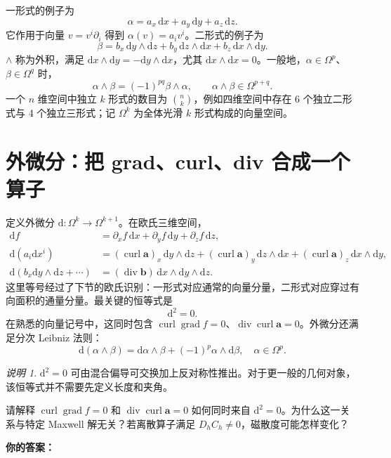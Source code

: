 \documentclass[UTF8,11pt,openany]{ctexbook}
\numberwithin{equation}{chapter}
\theoremstyle{definition}
\theoremstyle{remark}
\newtheorem{remark}[theorem]{说明}
\newcommand{\dd}{\mathrm d}
\newcommand{\grad}{\operatorname{grad}}
\newcommand{\Div}{\operatorname{div}}
\newcommand{\curl}{\operatorname{curl}}
\begin{document}
一形式的例子为
\begin{equation}
\alpha=a_x\,\dd x+a_y\,\dd y+a_z\,\dd z.
\end{equation}
它作用于向量 $v=v^i\partial_i$ 得到 $\alpha(v)=a_iv^i$。二形式的例子为
\begin{equation}
\beta=b_x\,\dd y\wedge\dd z+b_y\,\dd z\wedge\dd x+b_z\,\dd x\wedge\dd y.
\end{equation}
$\wedge$ 称为外积，满足 $\dd x\wedge\dd y=-\dd y\wedge\dd x$，尤其 $\dd x\wedge\dd x=0$。一般地，$\alpha\in\Omega^p$、$\beta\in\Omega^q$ 时，
\begin{equation}
\alpha\wedge\beta=(-1)^{pq}\beta\wedge\alpha,\qquad
\alpha\wedge\beta\in\Omega^{p+q}.
\end{equation}
一个 $n$ 维空间中独立 $k$ 形式的数目为 $\binom nk$，例如四维空间中存在 6 个独立二形式与 4 个独立三形式；记 $\Omega^k$ 为全体光滑 $k$ 形式构成的向量空间。

\section{外微分：把 grad、curl、div 合成一个算子}
定义外微分 $\dd:\Omega^k\to\Omega^{k+1}$。在欧氏三维空间，
\begin{align}
\dd f&=\partial_x f\,\dd x+\partial_yf\,\dd y+\partial_zf\,\dd z,\\
\dd(a_i\dd x^i)&=(\curl\bm a)_x\,\dd y\wedge\dd z+(\curl\bm a)_y\,\dd z\wedge\dd x
 +(\curl\bm a)_z\,\dd x\wedge\dd y,\\
\dd(b_x\dd y\wedge\dd z+\cdots)&=(\Div\bm b)\,\dd x\wedge\dd y\wedge\dd z.
\end{align}
这里等号经过了下节的欧氏识别：一形式对应通常的向量分量，二形式对应穿过有向面积的通量分量。最关键的恒等式是
\begin{equation}\label{eq:d2zero}
\boxed{\dd^2=0.}
\end{equation}
在熟悉的向量记号中，这同时包含 $\curl\grad f=0$、$\Div\curl\bm a=0$。外微分还满足分次 Leibniz 法则：
\begin{equation}
\dd(\alpha\wedge\beta)=\dd\alpha\wedge\beta+(-1)^p\alpha\wedge\dd\beta,
\quad \alpha\in\Omega^p.
\end{equation}
\begin{remark}
$\dd^2=0$ 可由混合偏导可交换加上反对称性推出。对于更一般的几何对象，该恒等式并不需要先定义长度和夹角。
\end{remark}

\begin{studentinput}
请解释 $\curl\grad f=0$ 和 $\Div\curl\bm a=0$ 如何同时来自 $\dd^2=0$。为什么这一关系与特定 Maxwell 解无关？若离散算子满足 $D_hC_h\ne0$，磁散度可能怎样变化？

\textbf{你的答案：}\vspace{2cm}
\end{studentinput}
\end{document}
